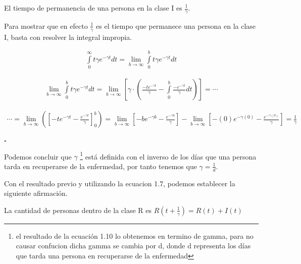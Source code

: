 \begin{Af}
El tiempo de permanencia de una persona en la clase I es $\frac{1}{\gamma}$. \cite{Martcheva}
\end{Af}

\begin{Dem}

Para mostrar que en efecto $\frac{1}{\gamma}$ es el tiempo que permanece una persona en la clase I, basta con resolver la integral impropia.

\begin{align*} 
\int \limits_{0}^{\infty} t\gamma e^{-\gamma t} dt = \lim\limits_{b\rightarrow \infty} \int \limits_{0}^{b} t\gamma e^{-\gamma t}dt 
\end{align*}

\begin{align*}
\lim\limits_{b\rightarrow \infty} \int \limits_{0}^{b} t\gamma e^{-\gamma t}dt = \lim\limits_{b\rightarrow \infty} \left[ \gamma \cdot \left( \frac{-t e^{-\gamma t}}{\gamma} - \int \limits_{0}^{b} \frac{-e^{-\gamma t}}{\gamma} dt \right)\right] = \cdots
\end{align*}

\begin{align*}
\cdots = \lim\limits_{b\rightarrow \infty} \left( \left[ -te^{- \gamma t} - \frac{e^{-\gamma t}}{\gamma} \right]_0^b \right) = \lim\limits_{b\rightarrow \infty} \left[ -be^{- \gamma b} - \frac{e^{- \gamma b}}{\gamma} \right] - \lim\limits_{b\rightarrow \infty} \left[ -(0)e^{- \gamma (0)} - \frac{e^{- \gamma (0)}}{\gamma} \right] = \frac{1}{\gamma}  \\
\end{align*}

\hfill	$\square$

\end{Dem}

Podemos concluir que $\gamma$ \footnote{el resultado de la ecuación 1.10 lo obtenemos en termino de gamma, para no causar confucion dicha gamma se cambia por d, donde d representa los días que tarda una persona en recuperarse de la enfermedad} está definida con el inverso de los días que una persona tarda en recuperarse de la enfermedad, por tanto tenemos que $\gamma = \frac{1}{d}$.

Con el resultado previo y utilizando la ecuacion 1.7, podemos establecer la siguiente afirmación.

\begin{Af}
La cantidad de personas dentro de la clase R es $R(t+\frac{1}{\gamma}) = R(t) + I(t)$
\end{Af}

